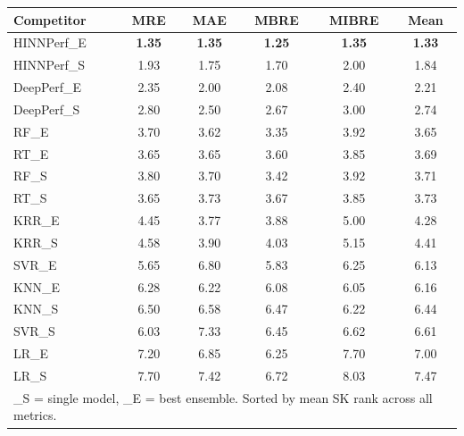 \begin{tabular}{lccccc}
\toprule
Competitor & MRE & MAE & MBRE & MIBRE & Mean \\ 
\midrule
\midrule
HINNPerf\_E & \textbf{1.35} & \textbf{1.35} & \textbf{1.25} & \textbf{1.35} & \textbf{1.33} \\
HINNPerf\_S & 1.93 & 1.75 & 1.70 & 2.00 & 1.84 \\
DeepPerf\_E & 2.35 & 2.00 & 2.08 & 2.40 & 2.21 \\
DeepPerf\_S & 2.80 & 2.50 & 2.67 & 3.00 & 2.74 \\
RF\_E & 3.70 & 3.62 & 3.35 & 3.92 & 3.65 \\
RT\_E & 3.65 & 3.65 & 3.60 & 3.85 & 3.69 \\
RF\_S & 3.80 & 3.70 & 3.42 & 3.92 & 3.71 \\
RT\_S & 3.65 & 3.73 & 3.67 & 3.85 & 3.73 \\
KRR\_E & 4.45 & 3.77 & 3.88 & 5.00 & 4.28 \\
KRR\_S & 4.58 & 3.90 & 4.03 & 5.15 & 4.41 \\
SVR\_E & 5.65 & 6.80 & 5.83 & 6.25 & 6.13 \\
KNN\_E & 6.28 & 6.22 & 6.08 & 6.05 & 6.16 \\
KNN\_S & 6.50 & 6.58 & 6.47 & 6.22 & 6.44 \\
SVR\_S & 6.03 & 7.33 & 6.45 & 6.62 & 6.61 \\
LR\_E & 7.20 & 6.85 & 6.25 & 7.70 & 7.00 \\
LR\_S & 7.70 & 7.42 & 6.72 & 8.03 & 7.47 \\
\bottomrule
\multicolumn{6}{l}{\footnotesize \_S = single model, \_E = best ensemble. Sorted by mean SK rank across all metrics.} \\
\end{tabular}
